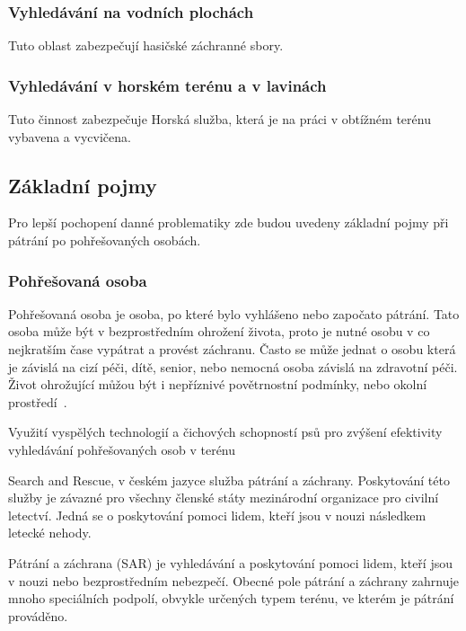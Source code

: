 \subsubsection{Vyhledávání na vodních plochách}
	Tuto oblast zabezpečují hasičské záchranné sbory.

\subsubsection{Vyhledávání v horském terénu a v lavinách}
	Tuto činnost zabezpečuje Horská služba, která je na práci v obtížném terénu vybavena a vycvičena. 
	
	
\subsection{Základní pojmy}
	Pro lepší pochopení danné problematiky zde budou uvedeny základní pojmy při pátrání po pohřešovaných osobách.
	
\subsubsection{Pohřešovaná osoba}
	Pohřešovaná osoba je osoba, po které bylo vyhlášeno nebo započato pátrání. Tato osoba může být v bezprostředním ohrožení života, proto je nutné osobu v co nejkratším čase vypátrat a provést záchranu. Často se může jednat o osobu která je závislá na cizí péči, dítě, senior, nebo nemocná osoba závislá na zdravotní péči. Život ohrožující můžou být i nepříznivé povětrnostní podmínky, nebo okolní prostředí~\cite{zachrana}.
	
	




	
	
	Využití vyspělých technologií a čichových
schopností psů pro zvýšení efektivity
vyhledávání pohřešovaných osob v terénu






Search and Rescue, v českém jazyce služba pátrání a záchrany. Poskytování této služby je závazné pro všechny členské státy mezinárodní organizace pro civilní letectví. Jedná se o poskytování pomoci lidem, kteří jsou v nouzi následkem letecké nehody. 




Pátrání a záchrana (SAR) je vyhledávání a poskytování pomoci lidem, kteří jsou v nouzi nebo bezprostředním nebezpečí. Obecné pole pátrání a záchrany zahrnuje mnoho speciálních podpolí, obvykle určených typem terénu, ve kterém je pátrání prováděno.

